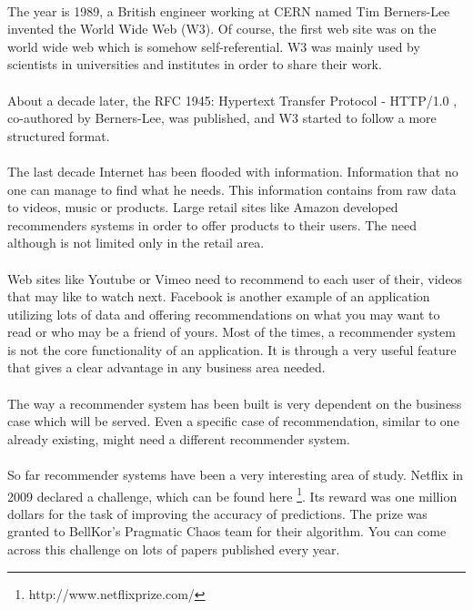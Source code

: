 \paragraph{} The year is 1989, a British engineer working at CERN named Tim Berners-Lee invented the World Wide Web (W3). Of course, the first web site was on the world wide web which is somehow self-referential. W3 was mainly used by scientists in universities and institutes in order to share their work. 

\paragraph{}About a decade later, the RFC 1945: Hypertext Transfer Protocol - HTTP/1.0 \cite{berners1997rfc}, co-authored by Berners-Lee, was published, and W3 started to follow a more structured format.

\paragraph{} The last decade Internet has been flooded with information. Information that no one can manage to find what he needs. This information contains from raw data to videos, music or products. Large retail sites like Amazon developed recommenders systems in order to offer products to their users. The need although is not limited only in the retail area. 
\paragraph{}Web sites like Youtube or Vimeo need to recommend to each user of their, videos that may like to watch next. Facebook is another example of an application utilizing lots of data and offering recommendations on what you may want to read or who may be a friend of yours. Most of the times, a recommender system is not the core functionality of an application. It is through a very useful feature that gives a clear advantage in any business area needed.

\paragraph{}The way a recommender system has been built is very dependent on the business case which will be served. Even a specific case of recommendation, similar to one already existing, might need a different recommender system.

\paragraph{} So far recommender systems have been a very interesting area of study. Netflix in 2009 declared a challenge, which can be found here \footnote{http://www.netflixprize.com/}. Its reward was one million dollars for the task of improving the accuracy of predictions. The prize was granted to BellKor’s Pragmatic Chaos team for their algorithm. You can come across this challenge on lots of papers published every year.

